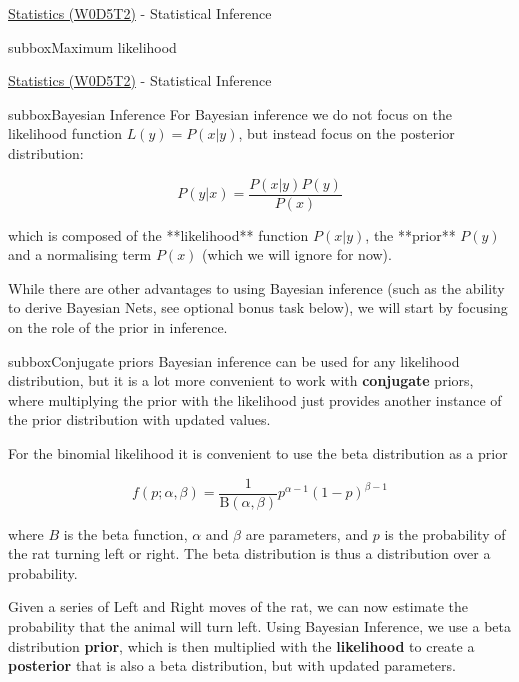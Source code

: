 \begin{multicols}{3}
\begin{textbox}{\href{https://compneuro.neuromatch.io/tutorials/W0D5_Statistics/student/W0D5_Tutorial2.html}{Statistics (W0D5T2)} - Statistical Inference}
\begin{subbox}{subbox}{Maximum likelihood}
\end{subbox}
\end{textbox}
\begin{textbox}{\href{https://compneuro.neuromatch.io/tutorials/W0D5_Statistics/student/W0D5_Tutorial2.html}{Statistics (W0D5T2)} - Statistical Inference}
\begin{subbox}{subbox}{Bayesian Inference}
\scriptsize
For Bayesian inference we do not focus on the likelihood function $L(y)=P(x|y)$, but instead focus on the posterior distribution: 

\begin{equation}
P(y|x)=\frac{P(x|y)P(y)}{P(x)}
\end{equation}

which is composed of the **likelihood** function $P(x|y)$, the **prior** $P(y)$ and a normalising term $P(x)$ (which we will ignore for now).

While there are other advantages to using Bayesian inference (such as the ability to derive Bayesian Nets, see optional bonus task below), we will start by focusing on the role of the prior in inference.

\end{subbox}
\begin{subbox}{subbox}{Conjugate priors}
\scriptsize
Bayesian inference can be used for any likelihood distribution, but it is a lot more convenient to work with \textbf{conjugate} priors, where multiplying the prior with the likelihood just provides another instance of the prior distribution with updated values. 

For the binomial likelihood it is convenient to use the beta distribution as a prior

\begin{equation}
f(p;\alpha ,\beta )={\frac {1}{\mathrm {B} (\alpha ,\beta )}}p^{\alpha -1}(1-p)^{\beta -1}
\end{equation}

where $B$ is the beta function, $\alpha$ and $\beta$ are parameters, and $p$ is the probability of the rat turning left or right. The beta distribution is thus a distribution over a probability.

Given a series of Left and Right moves of the rat, we can now estimate the probability that the animal will turn left. Using Bayesian Inference, we use a beta distribution \textbf{prior}, which is then multiplied with the \textbf{likelihood} to create a \textbf{posterior} that is also a beta distribution, but with updated parameters. 


\end{subbox}
\end{textbox}
\end{multicols}
